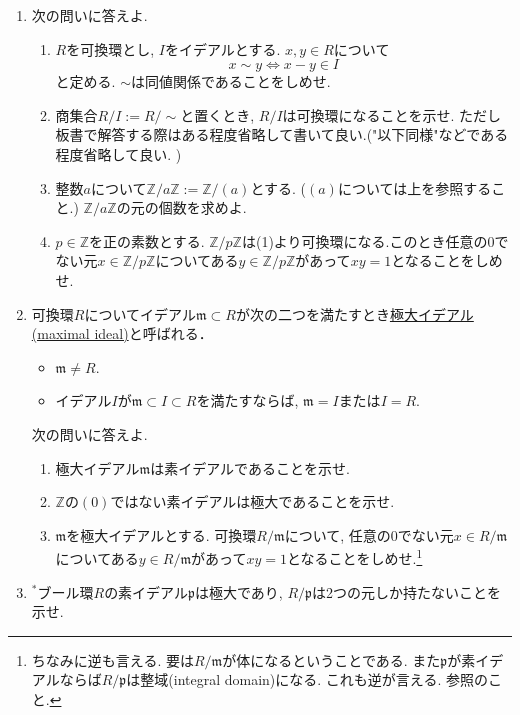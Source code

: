 \documentclass[dvipdfmx,a4paper,11pt]{article}
\newcommand{\Z}{\mathbb{Z}}
\theoremstyle{definition}
\begin{document}
\begin{enumerate}[label=\textbf{問}\ref*{sec-6}.\arabic*]
  
\item 次の問いに答えよ. 
    \begin{enumerate}[label=(\arabic*).]
 \setlength{\parskip}{0cm}
  \setlength{\itemsep}{0pt}
\item $R$を可換環とし, $I$をイデアルとする. $x,y \in R$について
$$
x \sim y \Leftrightarrow x - y \in I
$$
と定める. $\sim$は同値関係であることをしめせ. 
\item 商集合$R/I:=R/\sim$と置くとき, $R/I$は可換環になることを示せ.
ただし板書で解答する際はある程度省略して書いて良い.("以下同様"などである程度省略して良い. )
\item  整数$a$について$\Z/a\Z:=\Z/(a)$とする. ($(a)$については上を参照すること.) $\Z/a\Z$の元の個数を求めよ. 
\item $p \in \Z$を正の素数とする. $\Z/p\Z$は(1)より可換環になる.このとき任意の0でない元$x \in \Z/p\Z$についてある$y \in \Z/p\Z$があって$xy=1$となることをしめせ. 
\end{enumerate}

  
\item \label{3-maxi}
可換環$R$についてイデアル$\mathfrak{m}\subset R$が次の二つを満たすとき\underline{極大イデアル(maximal ideal)}と呼ばれる．
 \begin{itemize}
 \setlength{\parskip}{0cm}
  \setlength{\itemsep}{0pt}
  \item $\mathfrak{m} \neq R$.
    \item イデアル$I$が$\mathfrak{m} \subset I \subset R$を満たすならば, $\mathfrak{m}=I$または$I=R$.
\end{itemize}
次の問いに答えよ.
    \begin{enumerate}[label=(\arabic*).]
 \setlength{\parskip}{0cm}
  \setlength{\itemsep}{0pt}
\item 極大イデアル$\mathfrak{m}$は素イデアルであることを示せ.
\item $\Z$の$(0)$ではない素イデアルは極大であることを示せ. 
\item $\mathfrak{m}$を極大イデアルとする. 可換環$R/\mathfrak{m}$について, 任意の0でない元$x \in R/\mathfrak{m}$についてある$y \in R/\mathfrak{m}$があって$xy=1$となることをしめせ.\footnote{ちなみに逆も言える. 要は$R/\mathfrak{m}$が体になるということである. また$\mathfrak{p}$が素イデアルならば$R/\mathfrak{p}$は整域(integral domain)になる. これも逆が言える. \cite{AM}参照のこと. }
\end{enumerate}

\item $^{*}$ブール環$R$の素イデアル$\mathfrak{p}$は極大であり, $R/\mathfrak{p}$は2つの元しか持たないことを示せ.


\end{enumerate}
\end{document}
